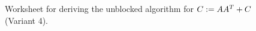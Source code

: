 \documentclass{article}
\begin{document}
\begin{figure}[tbp]

\begin{center}     %
\footnotesize      %
 
\worksheet         %
\end{center} 
 
 
\caption{ Worksheet for deriving the unblocked algorithm for 
$C := A A^T + C$ (Variant 4).} 
 
 
 
\label{FLA_Syrk_ln:ws_unb_var4} 
 
\end{figure} 




\renewcommand{\partitionings}{
  $
  A \rightarrow
  \FlaTwoByOne{A_{T}}
              {A_{B}}
  $
,
  $
  C \rightarrow
  \FlaTwoByTwo{C_{TL}}{C_{TR}}
              {C_{BL}}{C_{BR}}
  $
}

\renewcommand{\partitionsizes}{
$ A_{B} $ has $ 0 $ rows,
$ C_{BR} $ is $ 0 \times 0 $
}


\renewcommand{\repartitionings}{
$
  \FlaTwoByOne{ A_T }
              { A_B }
\rightarrow
  \FlaThreeByOneT{A_0}
                 {a_1^T}
                 {A_2}
$
,
$
  \FlaTwoByTwo{C_{TL}}{C_{TR}}
              {C_{BL}}{C_{BR}}
  \rightarrow
  \FlaThreeByThreeTL{C_{00}}{c_{01}}{C_{02}}
                    {c_{10}^T}{\gamma_{11}}{c_{12}^T}
                    {C_{20}}{c_{21}}{C_{22}}
$}

\renewcommand{\repartitionsizes}{
$ a_1 $ has $ 1 $ row,
  $ \gamma_{11} $ is $ 1 \times 1 $
}


\renewcommand{\moveboundaries}{
$
  \FlaTwoByOne{ A_T }
              { A_B }
\leftarrow
  \FlaThreeByOneB{A_0}
                 {a_1^T}
                 {A_2}
$
,
$
  \FlaTwoByTwo{C_{TL}}{C_{TR}}
              {C_{BL}}{C_{BR}}
  \leftarrow
  \FlaThreeByThreeBR{C_{00}}{c_{01}}{C_{02}}
                    {c_{10}^T}{\gamma_{11}}{c_{12}^T}
                    {C_{20}}{c_{21}}{C_{22}}
$}
\end{document}
